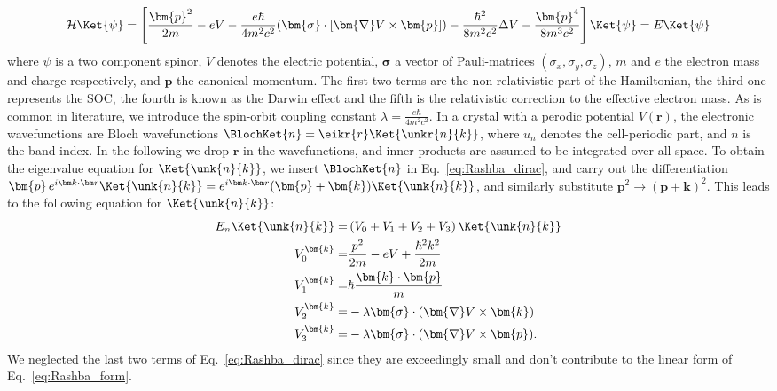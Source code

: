 \begin{equation}
	\label{eq:Rashba_dirac}
	\mathcal{H} \Ket{\psi} = \left[\frac{\bm{p}^2}{2m} - e V - \frac{e \hbar}{4m^2c^2}(\bm{\sigma}\cdot[\bm{\nabla}V \times \bm{p}]) - \frac{\hbar^2}{8m^2c^2} \Delta V - \frac{\bm{p}^4}{8m^3c^2}\right]\Ket{\psi} = E\Ket{\psi}
\end{equation}
where $\psi$ is a two component spinor, $V$ denotes the electric potential, $\bm{\sigma}$ a vector of Pauli-matrices $(\sigma_x, \sigma_y, \sigma_z)$, $m$ and $e$ the electron mass and charge respectively, and $\bm{p}$ the canonical momentum.
The first two terms are the non-relativistic part of the Hamiltonian, the third one represents the SOC, the fourth is known as the Darwin effect and the fifth is the relativistic correction to the effective electron mass. 
As is common in literature, we introduce the spin-orbit coupling constant $\lambda = \frac{e \hbar}{4m^2c^2}$.
In a crystal with a perodic potential $V(\bm{r})$, the electronic wavefunctions are Bloch wavefunctions $\BlochKet{n} = \eikr{r} \Ket{\unkr{n}{k}}$, where $u_n$ denotes the cell-periodic part, and $n$ is the band index.
In the following we drop $\bm{r}$ in the wavefunctions, and inner products are assumed to be integrated over all space.
To obtain the eigenvalue equation for $\Ket{\unk{n}{k}}$, we insert $\BlochKet{n}$ in Eq.~\ref{eq:Rashba_dirac}, and carry out the differentiation $\bm{p} \, \Eikr\Ket{\unk{n}{k}} = \Eikr(\bm{p} + \bm{k})\Ket{\unk{n}{k}}$, and similarly substitute $\bm{p}^2 \rightarrow (\bm{p}+\bm{k})^2$.
This leads to the following equation for $\Ket{\unk{n}{k}}$:
\begin{align}
	\label{eq:Rashba_unk_Vs}
	E_n \Ket{\unk{n}{k}} =& \left(V_0 + V_1  +  V_2 + V_3 \right) \Ket{\unk{n}{k}} \\
	V_0^{\bm{k}} =& \frac{p^2}{2m} - eV + \frac{\hbar^2 k^2}{2m} \\
	V_1^{\bm{k}} =& \hbar\frac{\bm{k}\cdot\bm{p}}{m} \\
	V_2^{\bm{k}} =& -\lambda \bm{\sigma} \cdot ( \bm{\nabla}V \times \bm{k}) \\
	V_3^{\bm{k}} =& -\lambda \bm{\sigma} \cdot ( \bm{\nabla}V \times \bm{p}).
\end{align}
We neglected the last two terms of Eq.~\ref{eq:Rashba_dirac} since they are exceedingly small and don't contribute to the linear form of Eq.~\ref{eq:Rashba_form}.

